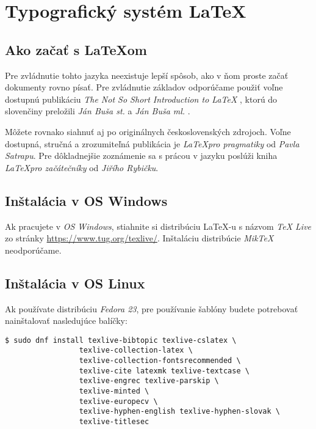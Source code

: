 
\chapter{Typografický systém \LaTeX}
\label{ch:instalacia}

\section{Ako začať s \LaTeX{}om}

Pre zvládnutie tohto jazyka neexistuje lepší spôsob, ako v ňom proste začať dokumenty rovno písať. Pre zvládnutie základov odporúčame použiť voľne dostupnú publikáciu \emph{The Not So Short Introduction to \LaTeX} \cite{lshort}, ktorú do slovenčiny preložili \emph{Ján Buša st.} a \emph{Ján Buša ml.} \cite{lshortsk}.

Môžete rovnako siahnuť aj po originálnych československých zdrojoch. Voľne dostupná, stručná a zrozumiteľná publikácia je \emph{\LaTeX pro pragmatiky} \cite{satrapa2011} od \emph{Pavla Satrapu}. Pre dôkladnejšie zoznámenie sa s prácou v jazyku poslúži kniha \emph{\LaTeX pro začátečníky} \cite{rybicka2003} od \emph{Jiřího Rybičku}. 


\section{Inštalácia v OS Windows}

Ak pracujete v \emph{OS Windows}, stiahnite si distribúciu \LaTeX-u s názvom \emph{TeX Live} zo stránky \url{https://www.tug.org/texlive/}. Inštaláciu distribúcie \emph{MikTeX} neodporúčame.


\section{Inštalácia v OS Linux}

Ak používate distribúciu \emph{Fedora 23}, pre používanie šablóny budete potrebovať nainštalovať nasledujúce balíčky:

\begin{verbatim}
$ sudo dnf install texlive-bibtopic texlive-cslatex \
                 texlive-collection-latex \
                 texlive-collection-fontsrecommended \
                 texlive-cite latexmk texlive-textcase \
                 texlive-engrec texlive-parskip \
                 texlive-minted \
                 texlive-europecv \
                 texlive-hyphen-english texlive-hyphen-slovak \
                 texlive-titlesec
\end{verbatim}

